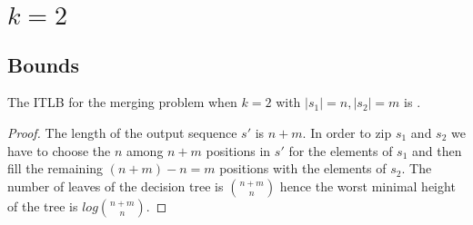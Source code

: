 \section{$k=2$}
\label{tree:merging:k=2}

\subsection{Bounds}
\label{tree:merging:k=2:bounds}


\begin{theorem}
The ITLB for the merging problem when $k = 2$ with $|s_1| = n, |s_2| = m$ is .
\end{theorem}

\begin{proof}
The length of the output sequence $s'$ is $n+m$. In order to zip $s_1$ and $s_2$ we have to choose the $n$ among $n+m$ positions in $s'$ for the elements of $s_1$ and then fill the remaining $(n+m) - n = m$ positions with the elements of $s_2$. The number of leaves of the decision tree is $\binom{n+m}{n}$ hence the worst minimal height of the tree is $log \binom{n+m}{n}$.
\end{proof}